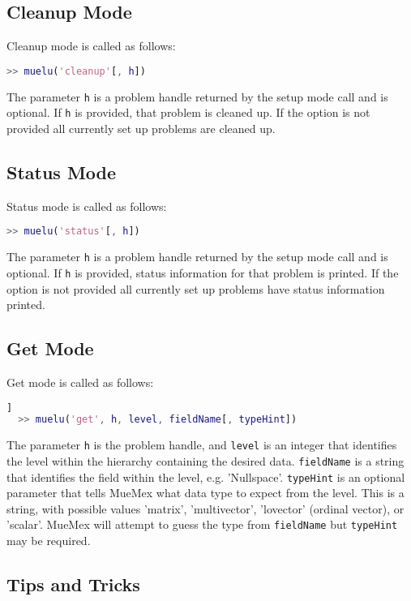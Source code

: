 \subsection{Cleanup Mode}
Cleanup mode is called as follows:
\begin{lstlisting}[language=Matlab]
  >> muelu('cleanup'[, h])
\end{lstlisting}
The parameter \texttt{h} is a problem handle returned by the
setup mode call and is optional.  If \texttt{h} is provided, that
problem is cleaned up.  If the option is not provided all currently
set up problems are cleaned up.

\subsection{Status Mode}
Status mode is called as follows:
\begin{lstlisting}[language=Matlab]
  >> muelu('status'[, h])
\end{lstlisting}
The parameter \texttt{h} is a problem handle returned by the
setup mode call and is optional.  If \texttt{h} is provided, status
information for that problem is printed.  If the option is not provided all currently
set up problems have status information printed.

\subsection{Get Mode}
Get mode is called as follows:
\begin{lstlisting}[language=Matlab]]
  >> muelu('get', h, level, fieldName[, typeHint])
\end{lstlisting}
The parameter \texttt{h} is the problem handle, and \texttt{level}
is an integer that identifies the level within the hierarchy containing
the desired data. \texttt{fieldName} is a string that identifies the
field within the level, e.g. 'Nullspace'. \texttt{typeHint} is an optional
parameter that tells MueMex what data type to expect from the level. This
is a string, with possible values 'matrix', 'multivector', 'lovector' (ordinal
vector), or 'scalar'. MueMex will attempt to guess the type from \texttt{fieldName}
but \texttt{typeHint} may be required.

\subsection{Tips and Tricks }\label{sec:muemex:tips}


